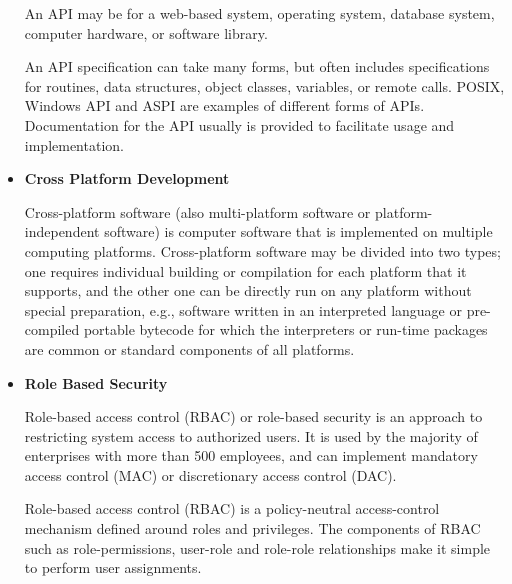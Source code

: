 \begin{itemize}
\par
An API may be for a web-based system, operating system, database system, computer hardware, or software library.
\par
An API specification can take many forms, but often includes specifications for routines, data structures, object classes, variables, or remote calls. POSIX, Windows API and ASPI are examples of different forms of APIs. Documentation for the API usually is provided to facilitate usage and implementation.
\item \textbf{Cross Platform Development}\par
Cross-platform software (also multi-platform software or platform-independent software) is computer software that is implemented on multiple computing platforms. Cross-platform software may be divided into two types; one requires individual building or compilation for each platform that it supports, and the other one can be directly run on any platform without special preparation, e.g., software written in an interpreted language or pre-compiled portable bytecode for which the interpreters or run-time packages are common or standard components of all platforms.
\item \textbf{Role Based Security}\par
Role-based access control (RBAC) or role-based security is an approach to restricting system access to authorized users. It is used by the majority of enterprises with more than 500 employees, and can implement mandatory access control (MAC) or discretionary access control (DAC).
\par
Role-based access control (RBAC) is a policy-neutral access-control mechanism defined around roles and privileges. The components of RBAC such as role-permissions, user-role and role-role relationships make it simple to perform user assignments.


\end{itemize}
